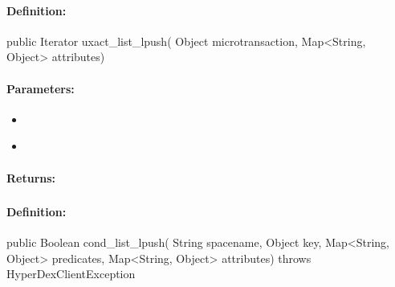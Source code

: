 \paragraph{Definition:}
\begin{javacode}
public Iterator uxact_list_lpush(
        Object microtransaction,
        Map<String, Object> attributes)
\end{javacode}

\paragraph{Parameters:}
\begin{itemize}[noitemsep]
\item {}\\

\item {}\\

\end{itemize}

\paragraph{Returns:}


\pagebreak
\subsubsection{}
\label{api:java:cond_list_lpush}


\paragraph{Definition:}
\begin{javacode}
public Boolean cond_list_lpush(
        String spacename,
        Object key,
        Map<String, Object> predicates,
        Map<String, Object> attributes) throws HyperDexClientException
\end{javacode}


